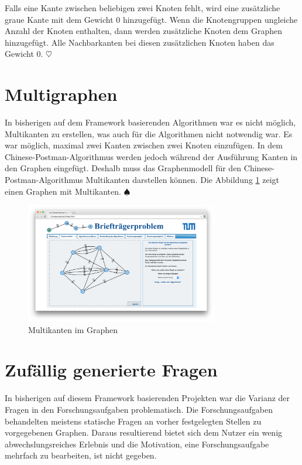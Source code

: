 Falls eine Kante zwischen beliebigen zwei Knoten fehlt, wird eine zusätzliche graue Kante mit dem Gewicht 0 hinzugefügt. Wenn die Knotengruppen ungleiche Anzahl der Knoten enthalten, dann werden zusätzliche Knoten dem Graphen hinzugefügt. Alle Nachbarkanten bei diesen zusätzlichen Knoten haben das Gewicht 0. \hfill$\heartsuit$

\section{Multigraphen} %
In bisherigen auf dem Framework basierenden Algorithmen war es nicht möglich, Multikanten zu erstellen, was auch für die Algorithmen nicht notwendig war. Es war möglich, maximal zwei Kanten zwischen zwei Knoten einzufügen. 
In dem Chinese-Postman-Algorithmus werden jedoch während der Ausführung Kanten in den Graphen eingefügt. Deshalb muss das Graphenmodell für den Chinese-Postman-Algorithmus Multikanten darstellen können. Die Abbildung \ref{fig:multigraph} zeigt einen Graphen mit Multikanten. \hfill$\spadesuit$
\begin{figure}[h!]
	\centering
	\includegraphics[width=0.75\textwidth]{figures/multigraph}
	\caption[Multigraph]{Multikanten im Graphen}\label{fig:multigraph}
\end{figure}

\section{Zufällig generierte Fragen} %
In bisherigen auf diesem Framework basierenden Projekten war die Varianz der Fragen in den Forschungsaufgaben problematisch. Die Forschungsaufgaben behandelten meistens statische Fragen an vorher festgelegten Stellen zu vorgegebenen Graphen. Daraus resultierend bietet sich dem Nutzer ein wenig abwechslungsreiches Erlebnis und die Motivation, eine Forschungsaufgabe mehrfach zu bearbeiten, ist nicht gegeben.

